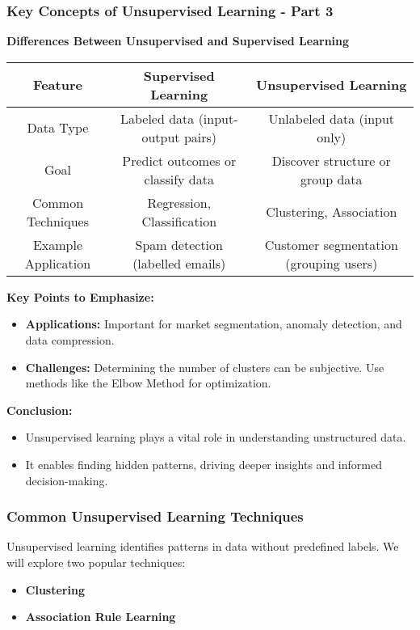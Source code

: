 \documentclass[aspectratio=169]{beamer}
\begin{document}
\begin{frame}[fragile]
    \frametitle{Key Concepts of Unsupervised Learning - Part 3}
    
    \textbf{Differences Between Unsupervised and Supervised Learning}
    
    \begin{center}
    \begin{tabular}{|c|c|c|}
        \hline
        \textbf{Feature} & \textbf{Supervised Learning} & \textbf{Unsupervised Learning} \\
        \hline
        Data Type & Labeled data (input-output pairs) & Unlabeled data (input only) \\
        \hline
        Goal & Predict outcomes or classify data & Discover structure or group data \\
        \hline
        Common Techniques & Regression, Classification & Clustering, Association \\
        \hline
        Example Application & Spam detection (labelled emails) & Customer segmentation (grouping users) \\
        \hline
    \end{tabular}
    \end{center}
    
    \textbf{Key Points to Emphasize:}
    \begin{itemize}
        \item \textbf{Applications:} Important for market segmentation, anomaly detection, and data compression.
        \item \textbf{Challenges:} Determining the number of clusters can be subjective. Use methods like the Elbow Method for optimization.
    \end{itemize}

    \textbf{Conclusion:}
    \begin{itemize}
        \item Unsupervised learning plays a vital role in understanding unstructured data.
        \item It enables finding hidden patterns, driving deeper insights and informed decision-making.
    \end{itemize}

\end{frame}

\begin{frame}[fragile]
    \frametitle{Common Unsupervised Learning Techniques}
    Unsupervised learning identifies patterns in data without predefined labels. 
    We will explore two popular techniques:
    \begin{itemize}
        \item \textbf{Clustering}
        \item \textbf{Association Rule Learning}
    \end{itemize}
\end{frame}
\end{document}
